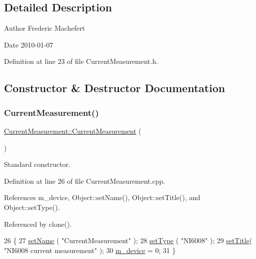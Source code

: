 \subsection{Detailed Description}
\begin{DoxyAuthor}{Author}
Frederic Machefert 
\end{DoxyAuthor}
\begin{DoxyDate}{Date}
2010-\/01-\/07 
\end{DoxyDate}


Definition at line 23 of file Current\+Measurement.\+h.



\subsection{Constructor \& Destructor Documentation}
\mbox{\label{classCurrentMeasurement_ad89184bc1f2386b71051d7976ec662f1}} 
\subsubsection{\texorpdfstring{Current\+Measurement()}{CurrentMeasurement()}}
{\footnotesize\ttfamily \hyperlink{classCurrentMeasurement_1_1CurrentMeasurement}{Current\+Measurement\+::\+Current\+Measurement} (\begin{DoxyParamCaption}{ }\end{DoxyParamCaption})}



Standard constructor. 



Definition at line 26 of file Current\+Measurement.\+cpp.



References m\+\_\+device, Object\+::set\+Name(), Object\+::set\+Title(), and Object\+::set\+Type().



Referenced by clone().


\begin{DoxyCode}
26                                         \{
27   \hyperlink{classObject_ae30fea75683c2d149b6b6d17c09ecd0c}{setName} ( \textcolor{stringliteral}{"CurrentMeasurement"} );
28   \hyperlink{classObject_aae534cc9d982bcb9b99fd505f2e103a5}{setType} ( \textcolor{stringliteral}{"NI6008"} );
29   \hyperlink{classObject_a89557dbbad5bcaa02652f5d7fa35d20f}{setTitle}( \textcolor{stringliteral}{"NI6008 current measurement"} );  
30   \hyperlink{classCurrentMeasurement_a7df157175089da57bd020b8680e87f80}{m\_device} = 0; 
31 \}
\end{DoxyCode}
\mbox{\label{classCurrentMeasurement_a86c291508b913b4b028567eeb8995c83}} 
